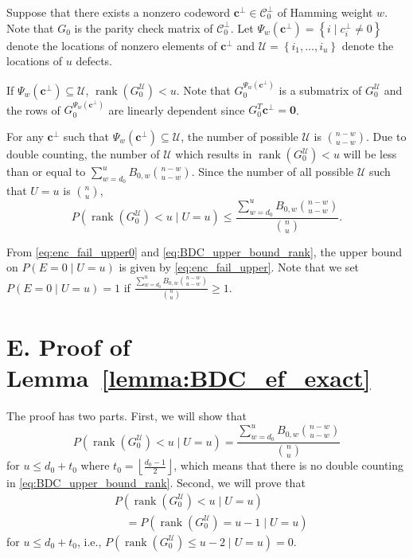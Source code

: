 \documentclass[10pt,twocolumn,twoside,submit]{JCNtran}
\DeclareMathOperator{\rank}{rank}
\begin{document}
	Suppose that there exists a nonzero codeword ${\mathbf{c}}^{\perp} \in {\mathcal{C}}_{0}^{\perp}$ of Hamming weight $w$. Note that $G_0$ is the parity check matrix of ${\mathcal{C}}_{0}^{\perp}$. Let $\Psi_w({\mathbf{c}}^{\perp})=\left\{ i \mid c_i^{\perp} \ne 0 \right\}$ denote the locations of nonzero elements of ${\mathbf{c}}^{\perp}$ and ${\mathcal{U}} = \left\{i_1,\ldots,i_u \right\}$ denote the locations of $u$ defects.
	
	If $\Psi_w({\mathbf{c}}^{\perp}) \subseteq \mathcal{U}$, $\rank \left( G_0^{\mathcal{U}} \right) < u$. Note that $G_0^{\Psi_{w}({\mathbf{c}}^{\perp})}$ is a submatrix of $G_0^{\mathcal{U}}$ and the rows of $G_0^{\Psi_{w}({\mathbf{c}}^{\perp})}$ are linearly dependent since $G_0^T {\mathbf{c}}^{\perp} = {\mathbf{0}}$.
	
	For any $\mathbf{c}^{\perp}$ such that $\Psi_w({\mathbf{c}}^{\perp}) \subseteq {\mathcal{U}}$, the number of possible $\mathcal{U}$ is $\binom{n-w}{u-w}$. Due to double counting, the number of $\mathcal{U}$ which results in $\rank \left( G_0^{\mathcal{U}} \right) < u$  will be less than or equal to $\sum_{w=d_{0}}^{u}{B_{0,w} \binom{n-w}{u-w}}$. Since the number of all possible $\mathcal{U}$ such that $U=u$ is $\binom{n}{u}$,
	\begin{equation} \label{eq:BDC_upper_bound_rank}
		P\left(\rank \left( G_0^{\mathcal{U}} \right) < u \mid U=u \right) \le \frac{\sum_{w=d_{0}}^{u}{B_{0, w} \binom{n-w}{u-w}}}{\binom{n}{u}}.
	\end{equation}
	
	From \eqref{eq:enc_fail_upper0} and \eqref{eq:BDC_upper_bound_rank}, the upper bound on $P\left(E=0 \mid U=u \right)$ is given by \eqref{eq:enc_fail_upper}. Note that we set $P\left(E=0 \mid U=u \right) = 1$ if $\frac{\sum_{w=d_{0}}^{u}{B_{0, w} \binom{n-w}{u-w}}}{\binom{n}{u}} \ge 1$.

\section*{E. Proof of Lemma~\ref{lemma:BDC_ef_exact}\label{pf:BDC_ef_exact}}

	The proof has two parts. First, we will show that
	\begin{equation} \label{eq:BDC_exact_condition_pf1}
	P\left(\rank \left( G_0^{\mathcal{U}} \right) < u \mid U=u \right) = \frac{\sum_{w=d_{0}}^{u}{B_{0, w} \binom{n-w}{u-w}}}{\binom{n}{u}}
	\end{equation}
	for $u \le d_0 + t_0$ where $t_0 = \left\lfloor \frac{d_0 - 1}{2} \right\rfloor$, which means that there is no double counting in \eqref{eq:BDC_upper_bound_rank}. Second, we will prove that
	\begin{align}
	& P\left(\rank \left( G_0^{\mathcal{U}} \right) < u \mid U=u \right) \nonumber \\
	& \quad = P\left(\rank \left( G_0^{\mathcal{U}} \right) = u-1 \mid U=u \right) \label{eq:BDC_exact_condition_pf2}
	\end{align}
	for $u \le d_0 + t_0$, i.e., $P\left(\rank \left( G_0^{\mathcal{U}} \right) \le u-2 \mid U=u \right)=0$.
	
\end{document}
